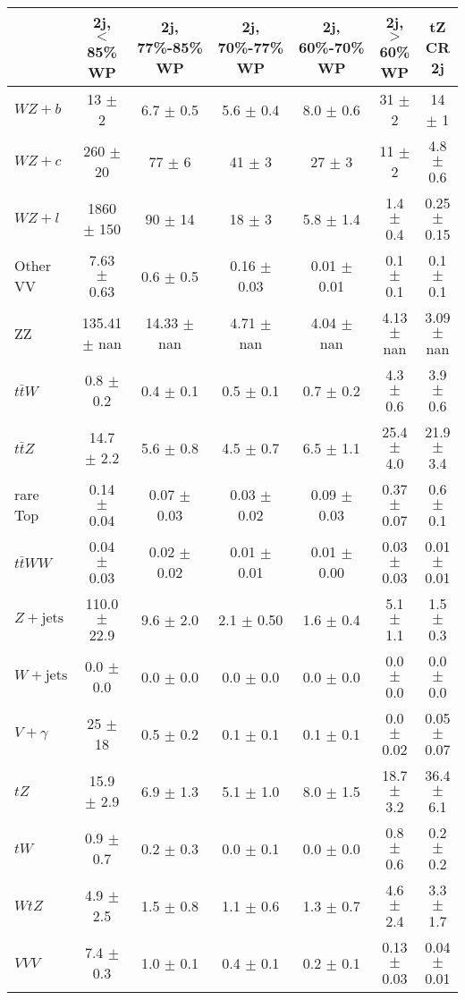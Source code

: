 \begin{tabular}{|l|c|c|c|c|c|c|}
\hline 
 & {2j, $<$85\% WP} & {2j, 77\%-85\% WP} & {2j, 70\%-77\% WP} & {2j, 60\%-70\% WP} & {2j, $>$60\% WP} & {tZ CR 2j}\\
\hline 
  $WZ + b$   & 13 $\pm$ 2 & 6.7 $\pm$ 0.5 & 5.6 $\pm$ 0.4 & 8.0 $\pm$ 0.6 & 31 $\pm$ 2 & 14 $\pm$ 1 \\ 
  $WZ + c$   & 260 $\pm$ 20 & 77 $\pm$ 6 & 41 $\pm$ 3 & 27 $\pm$ 3 & 11 $\pm$ 2 & 4.8 $\pm$ 0.6 \\ 
  $WZ + l$   & 1860 $\pm$ 150 & 90 $\pm$ 14 & 18 $\pm$ 3 & 5.8 $\pm$ 1.4 & 1.4 $\pm$ 0.4 & 0.25 $\pm$ 0.15 \\ 
  Other VV   & 7.63 $\pm$ 0.63 & 0.6 $\pm$ 0.5 & 0.16 $\pm$ 0.03 & 0.01 $\pm$ 0.01 & 0.1 $\pm$ 0.1 & 0.1 $\pm$ 0.1 \\ 
  ZZ   & 135.41 $\pm$ nan & 14.33 $\pm$ nan & 4.71 $\pm$ nan & 4.04 $\pm$ nan & 4.13 $\pm$ nan & 3.09 $\pm$ nan \\ 
  $t\bar{t}W$   & 0.8 $\pm$ 0.2 & 0.4 $\pm$ 0.1 & 0.5 $\pm$ 0.1 & 0.7 $\pm$ 0.2 & 4.3 $\pm$ 0.6 & 3.9 $\pm$ 0.6 \\ 
  $t\bar{t}Z$   & 14.7 $\pm$ 2.2 & 5.6 $\pm$ 0.8 & 4.5 $\pm$ 0.7 & 6.5 $\pm$ 1.1 & 25.4 $\pm$ 4.0 & 21.9 $\pm$ 3.4 \\ 
  rare Top   & 0.14 $\pm$ 0.04 & 0.07 $\pm$ 0.03 & 0.03 $\pm$ 0.02 & 0.09 $\pm$ 0.03 & 0.37 $\pm$ 0.07 & 0.6 $\pm$ 0.1 \\ 
  $t\bar{t}WW$   & 0.04 $\pm$ 0.03 & 0.02 $\pm$ 0.02 & 0.01 $\pm$ 0.01 & 0.01 $\pm$ 0.00 & 0.03 $\pm$ 0.03 & 0.01 $\pm$ 0.01 \\ 
  $Z+\text{jets}$   & 110.0 $\pm$ 22.9 & 9.6 $\pm$ 2.0 & 2.1 $\pm$ 0.50 & 1.6 $\pm$ 0.4 & 5.1 $\pm$ 1.1 & 1.5 $\pm$ 0.3 \\ 
  $W+\text{jets}$   & 0.0 $\pm$ 0.0 & 0.0 $\pm$ 0.0 & 0.0 $\pm$ 0.0 & 0.0 $\pm$ 0.0 & 0.0 $\pm$ 0.0 & 0.0 $\pm$ 0.0 \\ 
  $V+\gamma$   & 25 $\pm$ 18 & 0.5 $\pm$ 0.2 & 0.1 $\pm$ 0.1 & 0.1 $\pm$ 0.1 & 0.0 $\pm$ 0.02 & 0.05 $\pm$ 0.07 \\ 
  $tZ$   & 15.9 $\pm$ 2.9 & 6.9 $\pm$ 1.3 & 5.1 $\pm$ 1.0 & 8.0 $\pm$ 1.5 & 18.7 $\pm$ 3.2 & 36.4 $\pm$ 6.1 \\ 
  $tW$   & 0.9 $\pm$ 0.7 & 0.2 $\pm$ 0.3 & 0.0 $\pm$ 0.1 & 0.0 $\pm$ 0.0 & 0.8 $\pm$ 0.6 & 0.2 $\pm$ 0.2 \\ 
  $WtZ$   & 4.9 $\pm$ 2.5 & 1.5 $\pm$ 0.8 & 1.1 $\pm$ 0.6 & 1.3 $\pm$ 0.7 & 4.6 $\pm$ 2.4 & 3.3 $\pm$ 1.7 \\ 
  $VVV$   & 7.4 $\pm$ 0.3 & 1.0 $\pm$ 0.1 & 0.4 $\pm$ 0.1 & 0.2 $\pm$ 0.1 & 0.13 $\pm$ 0.03 & 0.04 $\pm$ 0.01 \\ 

\end{tabular}

